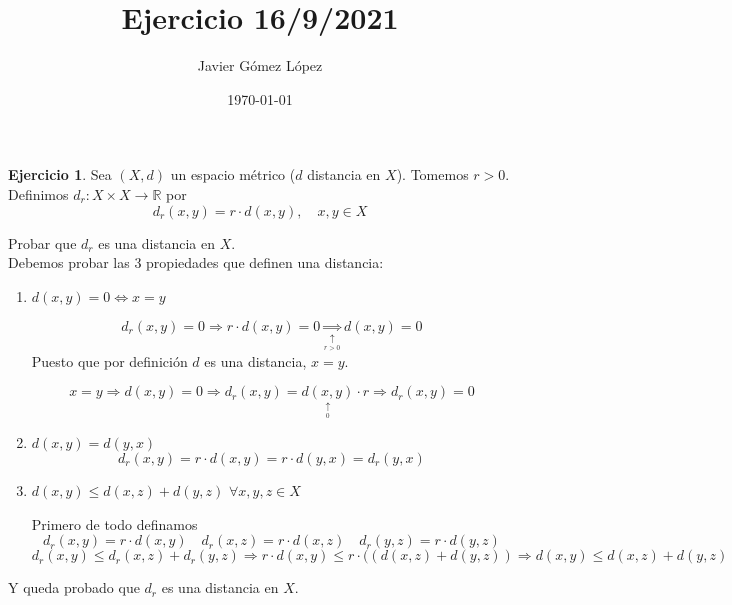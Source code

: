 \documentclass[a4paper, 12pt]{article}
\title{Ejercicio 16/9/2021}
\author{Javier Gómez López}
\date{\today}
\theoremstyle{definition}
\newtheorem{ej}{Ejercicio}
\begin{document}
\maketitle

\begin{ej}
Sea \((X,d)\) un espacio métrico (\(d\) distancia en \(X\)). Tomemos \(r > 0\). Definimos \(d_r : X \times X \longrightarrow \mathbb{R}\) por
\[
	d_r(x,y) = r \cdot d(x,y), \quad x,y \in X
\]

Probar que \(d_r\) es una distancia en \(X\). \\

Debemos probar las 3 propiedades que definen una distancia:
\begin{enumerate}
	\item \(d(x,y) = 0 \Longleftrightarrow x=y\)
	
\framebox[0.7cm][c]{\(\Rightarrow\)} 
\[
	d_r(x,y) = 0 \Rightarrow r \cdot d(x,y)=0 \underset{\underset{r>0}{\uparrow}}{\Rightarrow} d(x,y) = 0
\]
Puesto que por definición \(d\) es una distancia, \(x=y\).

\framebox[0.7cm][c]{\(\Leftarrow\)}
\[
	x=y \Rightarrow d(x,y) = 0 \Rightarrow d_r(x,y) = \underset{\underset{0}{\uparrow}}{d(x,y)} \cdot r \Rightarrow d_r(x,y) = 0
\]

	\item \(d(x,y) = d(y,x)\)
\[
	d_r(x,y) = r \cdot d(x,y) = r \cdot d(y,x) = d_r(y,x)
\]

	\item \(d(x,y) \leq d(x,z) + d(y,z)\) \(\forall x,y,z \in X\)

Primero de todo definamos
\[
	d_r(x,y) = r \cdot d(x,y) \quad d_r(x,z) = r \cdot d(x,z) \quad d_r(y,z) = r \cdot d(y,z)
\]
\[
	d_r(x,y) \leq d_r(x,z) + d_r(y,z) \Rightarrow r \cdot d(x,y) \leq r \cdot ((d(x,z) + d(y,z)) \Rightarrow d(x,y) \leq d(x,z) + d(y,z)
\]
\end{enumerate}

Y queda probado que \(d_r\) es una distancia en \(X\).
\end{ej}
\end{document}
